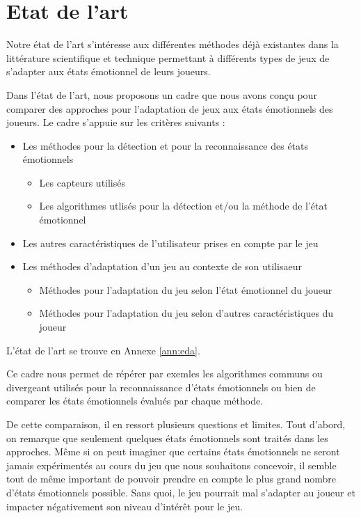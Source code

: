 \documentclass{article}
\begin{document}
\section{Etat de l'art}\label{sec:etatart}
	Notre état de l'art s'intéresse aux différentes méthodes déjà existantes dans la littérature scientifique et technique permettant à différents types de jeux de s'adapter aux états émotionnel de leurs joueurs.\par
	Dans l'état de l'art, nous proposons un cadre que nous avons conçu pour comparer des approches pour l'adaptation de jeux aux états émotionnels des joueurs. Le cadre s'appuie sur les critères suivants :
	\begin{itemize}
		\item Les méthodes pour la détection et pour la reconnaissance des états émotionnels
		\begin{itemize}
			\item Les capteurs utilisés
			\item Les algorithmes utlisés pour la détection et/ou la méthode de l'état émotionnel
		\end{itemize}
		\item Les autres caractéristiques de l'utilisateur prises en compte par le jeu
		\item Les méthodes d'adaptation d'un jeu au contexte de son utilisaeur
		\begin{itemize}
			\item Méthodes pour l'adaptation du jeu selon l'état émotionnel du joueur
			\item Méthodes pour l'adaptation du jeu selon d'autres caractéristiques du joueur
		\end{itemize}
	\end{itemize}
	L'état de l'art se trouve en Annexe \ref{ann:eda}.\par
	Ce cadre nous permet de répérer par exemles les algorithmes communs ou divergeant utilisés pour la reconnaissance d'états émotionnels ou bien de comparer les états émotionnels évalués par chaque méthode.\par
	De cette comparaison, il en ressort plusieurs questions et limites.
	Tout d'abord, on remarque que seulement quelques états émotionnels sont traités dans les approches. 
	Même si on peut imaginer que certains états émotionnels ne seront jamais expérimentés au cours du jeu que nous souhaitons concevoir, il semble tout de même important de pouvoir prendre en compte le plus grand nombre d'états émotionnels possible.
	Sans quoi, le jeu pourrait mal s'adapter au joueur et impacter négativement son niveau d'intérêt pour le jeu.\par
\end{document}
